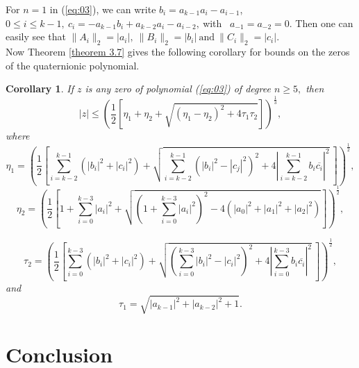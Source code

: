 \documentclass [12pt]{article}
\newtheorem{corollary}{Corollary}
[theorem]
\begin{document}
\noindent For $n=1$ in (\ref{eq:03}), we can write $b_i = a_{k-1}a_i - a_{i-1}$, $0 \leq i \leq k-1,~ c_{i}=-a_{k-1}b_{i}+a_{k-2}a_{i}-a_{i-2},~$with~ $a_{-1}=a_{-2} = 0$. Then one can easily see that $\|A_{i}\|_{2}=|a_{i}|,~\|B_{i}\|_{2}=|b_{i}| ~\mbox{and}~\|C_{i}\|_{2}=|c_{i}|.$ \\Now Theorem \ref{theorem 3.7} gives the following corollary for bounds on the zeros of the quaternionic polynomial.
\begin{corollary}
    If $z$ is any zero of polynomial (\ref{eq:03}) of degree $n\ge 5,$ then 
    \begin{equation*}
|z| \le \left( \frac{1}{2} \left[ \eta _{1} + \eta_{2} +\sqrt{(\eta_{1}-\eta_{2})^{2}+4\tau_{1}\tau_{2} } \right] \right)^{\frac{1}{3}},
\end{equation*}
where  \begin{equation*}
    \eta_{1}=\left( \frac{1}{2} \left[   \sum_{i=k-2}^{k-1} \left(|b_{i}|^{2}+|c_{i}|^{2} \right)    +\sqrt{\sum_{i=k-2}^{k-1} \left(|b_{i}|^{2}-|c_{j}|^{2} \right)^{2}+4\left|\sum_{i=k-2}^{k-1}b_{i}\overline{c_{i}} \right|^{2}}~                   \right] \right)^{\frac{1}{2}},  
\end{equation*}
\begin{equation*}
    \eta_{2}=\left( \frac{1}{2} \left[ 1+ \sum_{i=0}^{k-3}|a_{i}|^{2} 
    +\sqrt{\left( 1+ \sum_{i=0}^{k-3}|a_{i}|^{2}\right)^{2} -4\left(|a_{0}|^{2} +|a_{1}|^{2}+|a_{2}|^{2}\right) }\right] \right)^\frac{1}{2},
\end{equation*}

\begin{equation*}
\tau_{2}=\left( \frac{1}{2} \left[   \sum_{i=0}^{k-3} \left(|b_{i}|^{2}+|c_{i}|^{2} \right)    +\sqrt{ \left(\sum_{i=0}^{k-3}|b_{i}|^{2}-|c_{i}|^{2} \right)^{2}+4\left|\sum_{i=0}^{k-3}b_{i}\overline{c_{i}} \right|^{2}}~                   \right] \right)^{\frac{1}{2}}, 
\end{equation*}
 and 
 \begin{equation*}
    \tau_{1}=\sqrt{|a_{k-1}|^{2}+|a_{k-2}|^{2}+1}.
\end{equation*}
\end{corollary}


\section{Conclusion}
\end{document}
